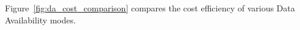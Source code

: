 
Figure~\ref{fig:da_cost_comparison} compares the cost efficiency of various Data Availability modes.
